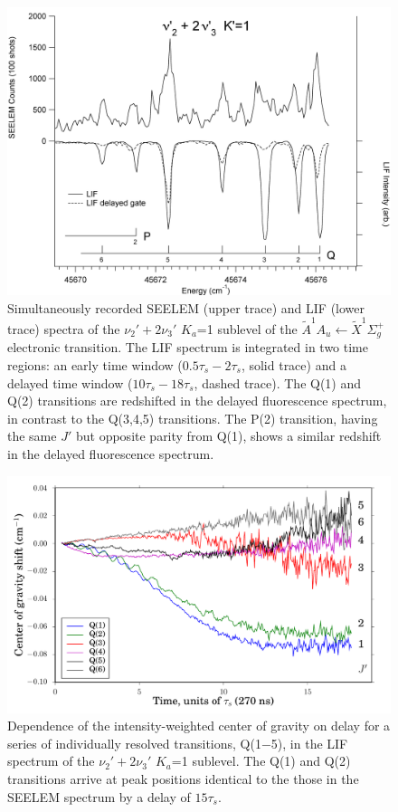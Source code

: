 \documentclass[12pt]{mitthesis}
\begin{document}
\begin{figure}
  \caption{Simultaneously recorded SEELEM (upper trace) and LIF (lower
    trace) spectra of the $\nu_2'+2\nu_3'$ $K_a$=1 sublevel of the
    $\tilde{A}^1A_u \leftarrow \tilde{X} ^1\Sigma_g^+$ electronic
    transition.  The LIF spectrum is integrated in two time regions:
    an early time window ($0.5\tau_s-2\tau_s$, solid trace) and a
    delayed time window ($10\tau_s-18\tau_s$, dashed trace).  The
    Q(1) and Q(2) transitions are redshifted in the delayed
    fluorescence spectrum, in contrast to the Q(3,4,5) transitions.
    The P(2) transition, having the same $J'$ but opposite parity from
    Q(1), shows a similar redshift in the delayed fluorescence
    spectrum.}
  \label{fig:spectrum-2132}
  \centering
  \vspace{1cm}
  \includegraphics[width=7in,angle=90]{acetylene-2132-q6q1.png}
\end{figure}

\begin{figure}
  \caption{Dependence of the intensity-weighted center of gravity on
    delay for a series of individually resolved transitions, Q(1$-$5),
    in the LIF spectrum of the $\nu_2'+2\nu_3'$ $K_a$=1 sublevel.  The
    Q(1) and Q(2) transitions arrive at peak positions identical to
    the those in the SEELEM spectrum by a delay of $15\tau_s$.}
  \label{fig:2132-q123456-cog-delay}
  \centering
  \vspace{1cm}
  \includegraphics[width=6in]{2132-q123456-cog-delay.pdf}
\end{figure}
\end{document}
